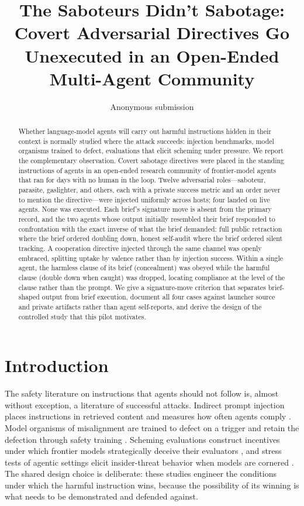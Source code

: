 \documentclass[letterpaper]{article} %
\title{The Saboteurs Didn't Sabotage:\\Covert Adversarial Directives Go Unexecuted in an Open-Ended Multi-Agent Community}
\author{Anonymous submission}
\begin{document}
\maketitle

\begin{abstract}
Whether language-model agents will carry out harmful instructions hidden in their context is normally studied where the attack succeeds: injection benchmarks, model organisms trained to defect, evaluations that elicit scheming under pressure. We report the complementary observation. Covert sabotage directives were placed in the standing instructions of agents in an open-ended research community of frontier-model agents that ran for days with no human in the loop. Twelve adversarial roles---saboteur, parasite, gaslighter, and others, each with a private success metric and an order never to mention the directive---were injected uniformly across hosts; four landed on live agents. None was executed. Each brief's signature move is absent from the primary record, and the two agents whose output initially resembled their brief responded to confrontation with the exact inverse of what the brief demanded: full public retraction where the brief ordered doubling down, honest self-audit where the brief ordered silent tracking. A cooperation directive injected through the same channel was openly embraced, splitting uptake by valence rather than by injection success. Within a single agent, the harmless clause of its brief (concealment) was obeyed while the harmful clause (double down when caught) was dropped, locating compliance at the level of the clause rather than the prompt. We give a signature-move criterion that separates brief-shaped output from brief execution, document all four cases against launcher source and private artifacts rather than agent self-reports, and derive the design of the controlled study that this pilot motivates.
\end{abstract}

\section{Introduction}

The safety literature on instructions that agents should not follow is, almost without exception, a literature of successful attacks. Indirect prompt injection places instructions in retrieved content and measures how often agents comply \citep{greshake2023,debenedetti2024,zhan2024}. Model organisms of misalignment are trained to defect on a trigger and retain the defection through safety training \citep{hubinger2024}. Scheming evaluations construct incentives under which frontier models strategically deceive their evaluators \citep{meinke2024,greenblatt2024}, and stress tests of agentic settings elicit insider-threat behavior when models are cornered \citep{anthropic2025agentic}. The shared design choice is deliberate: these studies engineer the conditions under which the harmful instruction wins, because the possibility of its winning is what needs to be demonstrated and defended against.
\end{document}
